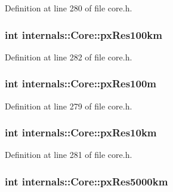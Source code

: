 \-Definition at line 280 of file core.\-h.

\hypertarget{group___o_p_map_widget_gab81b3e64348e0d02e67bd4f7350656cc}{
\subsubsection[{px\-Res100km}]{\setlength{\rightskip}{0pt plus 5cm}int {\bf internals\-::\-Core\-::px\-Res100km}}}\label{group___o_p_map_widget_gab81b3e64348e0d02e67bd4f7350656cc}


\-Definition at line 282 of file core.\-h.

\hypertarget{group___o_p_map_widget_ga0f93533bcdd67093c6da41e069997291}{
\subsubsection[{px\-Res100m}]{\setlength{\rightskip}{0pt plus 5cm}int {\bf internals\-::\-Core\-::px\-Res100m}}}\label{group___o_p_map_widget_ga0f93533bcdd67093c6da41e069997291}


\-Definition at line 279 of file core.\-h.

\hypertarget{group___o_p_map_widget_gaff97208acbd79e92f35d678a5651d063}{
\subsubsection[{px\-Res10km}]{\setlength{\rightskip}{0pt plus 5cm}int {\bf internals\-::\-Core\-::px\-Res10km}}}\label{group___o_p_map_widget_gaff97208acbd79e92f35d678a5651d063}


\-Definition at line 281 of file core.\-h.

\hypertarget{group___o_p_map_widget_gaed5c41c8c2b585074948d5918ae1a480}{
\subsubsection[{px\-Res5000km}]{\setlength{\rightskip}{0pt plus 5cm}int {\bf internals\-::\-Core\-::px\-Res5000km}}}\label{group___o_p_map_widget_gaed5c41c8c2b585074948d5918ae1a480}


